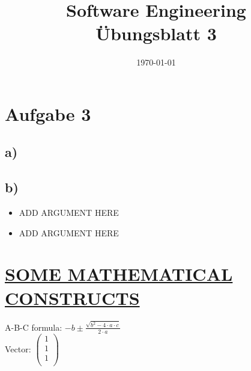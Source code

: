 \documentclass[12pt,pdftex,a4paper]{article}
\title{\vspace{-1cm} Software Engineering \\ Übungsblatt 3}
\date{\today}
\begin{document}
\setlength{\parindent}{0pt}
\maketitle
\thispagestyle{fancy}




\section*{Aufgabe 3}

\subsection*{a) }
\subsection*{b) }


\begin{itemize}

\item ADD ARGUMENT HERE

\item ADD ARGUMENT HERE
\end{itemize}

\section*{\underline{SOME MATHEMATICAL CONSTRUCTS}}

A-B-C formula: $-b \pm \frac{\sqrt{b^2 - 4 \cdot a \cdot c}}{2 \cdot a}$\\ %

Vector:
$\begin{pmatrix}
1\\
1\\
1\\
\end{pmatrix}$\\\\
\end{document}
